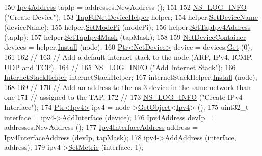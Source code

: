 \begin{DoxyCode}
150   \hyperlink{classns3_1_1Ipv4Address}{Ipv4Address} tapIp = addresses.NewAddress ();
151 
152   \hyperlink{group__logging_gafbd73ee2cf9f26b319f49086d8e860fb}{NS\_LOG\_INFO} (\textcolor{stringliteral}{"Create Device"});
153   \hyperlink{classns3_1_1TapFdNetDeviceHelper}{TapFdNetDeviceHelper} helper;
154   helper.\hyperlink{classns3_1_1EmuFdNetDeviceHelper_aa5c26a78442e507ba969f28ffa5f748e}{SetDeviceName} (deviceName);
155   helper.\hyperlink{classns3_1_1TapFdNetDeviceHelper_aa514fd85b9be3d13b2402c2dc0ac8a6d}{SetModePi} (modePi);
156   helper.\hyperlink{classns3_1_1TapFdNetDeviceHelper_aa1283be36ca8f45294ff480566994f97}{SetTapIpv4Address} (tapIp);
157   helper.\hyperlink{classns3_1_1TapFdNetDeviceHelper_a727c7402978ea7425cf4d4d16cb73783}{SetTapIpv4Mask} (tapMask);
158 
159   \hyperlink{classns3_1_1NetDeviceContainer}{NetDeviceContainer} devices = helper.\hyperlink{classns3_1_1FdNetDeviceHelper_af70d55cbb4f6411c33cacb84eb651ad5}{Install} (node);
160   \hyperlink{classns3_1_1Ptr}{Ptr<NetDevice>} device = devices.\hyperlink{classns3_1_1NetDeviceContainer_a677d62594b5c9d2dea155cc5045f4d0b}{Get} (0);
161 
162   \textcolor{comment}{//}
163   \textcolor{comment}{// Add a default internet stack to the node (ARP, IPv4, ICMP, UDP and TCP).}
164   \textcolor{comment}{//}
165   \hyperlink{group__logging_gafbd73ee2cf9f26b319f49086d8e860fb}{NS\_LOG\_INFO} (\textcolor{stringliteral}{"Add Internet Stack"});
166   \hyperlink{classns3_1_1InternetStackHelper}{InternetStackHelper} internetStackHelper;
167   internetStackHelper.\hyperlink{classns3_1_1InternetStackHelper_a6645b412f31283d2d9bc3d8a95cebbc0}{Install} (node);
168 
169   \textcolor{comment}{//}
170   \textcolor{comment}{// Add an address to the ns-3 device in the same network than one}
171   \textcolor{comment}{// assigned to the TAP.}
172   \textcolor{comment}{//}
173   \hyperlink{group__logging_gafbd73ee2cf9f26b319f49086d8e860fb}{NS\_LOG\_INFO} (\textcolor{stringliteral}{"Create IPv4 Interface"});
174   \hyperlink{classns3_1_1Ptr}{Ptr<Ipv4>} ipv4 = node->\hyperlink{classns3_1_1Object_a13e18c00017096c8381eb651d5bd0783}{GetObject}<\hyperlink{classns3_1_1Ipv4}{Ipv4}> ();
175   uint32\_t \textcolor{keyword}{interface }= ipv4->AddInterface (device);
176   \hyperlink{classns3_1_1Ipv4Address}{Ipv4Address} devIp = addresses.NewAddress ();
177   \hyperlink{classns3_1_1Ipv4InterfaceAddress}{Ipv4InterfaceAddress} address = \hyperlink{classns3_1_1Ipv4InterfaceAddress}{Ipv4InterfaceAddress} (devIp, 
      tapMask);
178   ipv4->\hyperlink{classns3_1_1Ipv4_ad203526cae6a4b86f1bb89e44d2b62f7}{AddAddress} (interface, address);
179   ipv4->\hyperlink{classns3_1_1Ipv4_a2b5632573b67957fabe2dfea248a57a3}{SetMetric} (interface, 1);

\end{DoxyCode}
